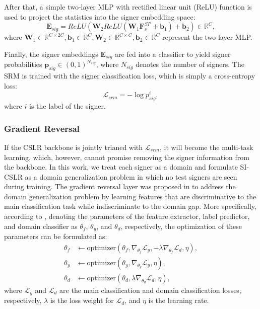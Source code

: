 \documentclass[acmsmall,screen]{acmart}
\def \mbf{\mathbf}
\def \mbb{\mathbb}
\begin{document}
After that, a simple two-layer MLP with rectified linear unit (ReLU) function is used to project the statistics into the signer embedding space:
\begin{equation}
    \mbf{E}_{sig} = ReLU(\mbf{W}_2 ReLU(\mbf{W}_1 \mbf{F}_s^{SP}+\mbf{b}_1)+\mbf{b}_2) \in \mbb{R}^{C},
\end{equation}
where $\mbf{W}_1 \in \mbb{R}^{C\times 2C}, \mbf{b}_1 \in \mbb{R}^C, \mbf{W}_2 \in \mbb{R}^{C\times C}, \mbf{b}_2 \in \mbb{R}^C$ represent the two-layer MLP.

Finally, the signer embeddings $\mbf{E}_{sig}$ are fed into a classifier to yield signer probabilities $\mbf{p}_{sig} \in (0,1)^{N_{sig}}$, where $N_{sig}$ denotes the number of signers. 
The SRM is trained with the signer classification loss, which is simply a cross-entropy loss:
\begin{equation}
    \mathcal{L}_{srm} = -\log p_{sig}^i,
\end{equation}
where $i$ is the label of the signer.

\subsubsection{Gradient Reversal}
If the CSLR backbone is jointly trianed with $\mathcal{L}_{srm}$, it will become the multi-task learning, which, however, cannot promise removing the signer information from the backbone.
In this work, we treat each signer as a domain and formulate SI-CSLR as a domain generalization problem in which no test signers are seen during training. 
The gradient reversal layer was proposed in \cite{ganin2016domain} to address the domain generalization problem by learning features that are discriminative to the main classification task while indiscriminate to the domain gap.
More specifically, according to \cite{ganin2016domain}, denoting the parameters of the feature extractor, label predictor, and domain classifier as $\theta_f$, $\theta_y$, and $\theta_d$, respectively, the optimization of these parameters can be formulated as:
\begin{equation}
\label{equ:grad_rev}
\begin{split}
\theta_f &\leftarrow \text{optimizer}(\theta_f, \nabla_{\theta_f}\mathcal{L}_y, -\lambda \nabla_{\theta_f}\mathcal{L}_d, \eta), \\
\theta_y &\leftarrow \text{optimizer}(\theta_y, \nabla_{\theta_y}\mathcal{L}_y, \eta), \\
\theta_d &\leftarrow \text{optimizer}(\theta_d, \lambda \nabla_{\theta_d}\mathcal{L}_d, \eta),
\end{split}
\end{equation}
where $\mathcal{L}_y$ and $\mathcal{L}_d$ are the main classification and domain classification losses, respectively, $\lambda$ is the loss weight for $\mathcal{L}_d$, and $\eta$ is the learning rate.
\end{document}
